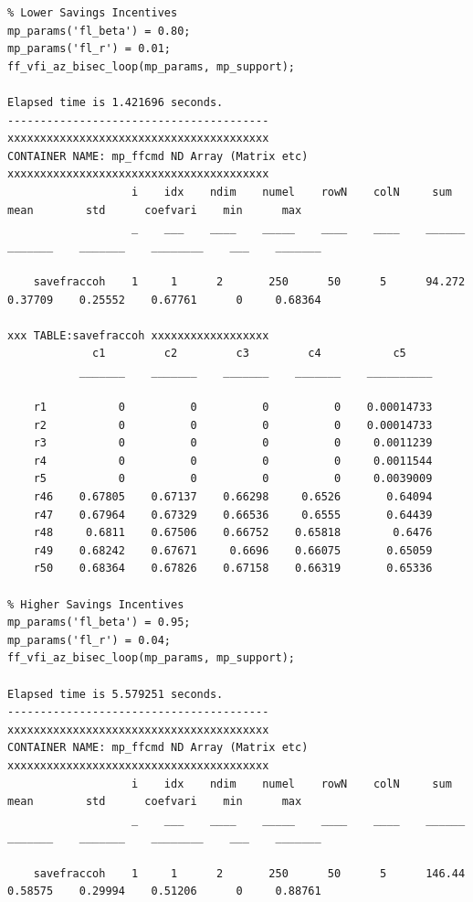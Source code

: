 \documentclass[
]{book}
\begin{document}
\begin{verbatim}
% Lower Savings Incentives
mp_params('fl_beta') = 0.80;
mp_params('fl_r') = 0.01;
ff_vfi_az_bisec_loop(mp_params, mp_support);

Elapsed time is 1.421696 seconds.
----------------------------------------
xxxxxxxxxxxxxxxxxxxxxxxxxxxxxxxxxxxxxxxx
CONTAINER NAME: mp_ffcmd ND Array (Matrix etc)
xxxxxxxxxxxxxxxxxxxxxxxxxxxxxxxxxxxxxxxx
                   i    idx    ndim    numel    rowN    colN     sum       mean        std      coefvari    min      max  
                   _    ___    ____    _____    ____    ____    ______    _______    _______    ________    ___    _______

    savefraccoh    1     1      2       250      50      5      94.272    0.37709    0.25552    0.67761      0     0.68364

xxx TABLE:savefraccoh xxxxxxxxxxxxxxxxxx
             c1         c2         c3         c4           c5    
           _______    _______    _______    _______    __________

    r1           0          0          0          0    0.00014733
    r2           0          0          0          0    0.00014733
    r3           0          0          0          0     0.0011239
    r4           0          0          0          0     0.0011544
    r5           0          0          0          0     0.0039009
    r46    0.67805    0.67137    0.66298     0.6526       0.64094
    r47    0.67964    0.67329    0.66536     0.6555       0.64439
    r48     0.6811    0.67506    0.66752    0.65818        0.6476
    r49    0.68242    0.67671     0.6696    0.66075       0.65059
    r50    0.68364    0.67826    0.67158    0.66319       0.65336

% Higher Savings Incentives
mp_params('fl_beta') = 0.95;
mp_params('fl_r') = 0.04;
ff_vfi_az_bisec_loop(mp_params, mp_support);

Elapsed time is 5.579251 seconds.
----------------------------------------
xxxxxxxxxxxxxxxxxxxxxxxxxxxxxxxxxxxxxxxx
CONTAINER NAME: mp_ffcmd ND Array (Matrix etc)
xxxxxxxxxxxxxxxxxxxxxxxxxxxxxxxxxxxxxxxx
                   i    idx    ndim    numel    rowN    colN     sum       mean        std      coefvari    min      max  
                   _    ___    ____    _____    ____    ____    ______    _______    _______    ________    ___    _______

    savefraccoh    1     1      2       250      50      5      146.44    0.58575    0.29994    0.51206      0     0.88761


\end{verbatim}
\end{document}
